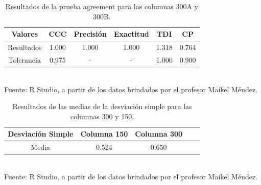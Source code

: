 \documentclass[12pt, letterpaper]{article}
\begin{document}
\begin{table}[ht]
\centering
\caption{Resultados de la prueba agreement para las columnas 300A y 300B.}
\begin{tabular}{cccccc}
  \hline
Valores & CCC & Precisión & Exactitud & TDI & CP \\ 
  \hline
  Resultados & 1.000 & 1.000 & 1.000 & 1.318 & 0.764 \\ 
  Tolerancia & 0.975 & - & - & 1.000 & 0.900 \\ 
   \hline
\end{tabular}\\
Fuente: R Studio, a partir de los datos brindados por el profesor Maikel Méndez.
\end{table}

\begin{table}[ht]
\centering
\caption{Resultados de las medias de la desviación simple para las columnas 300 y 150.}
\begin{tabular}{ccccc}
  \hline
Desviación Simple & Columna 150 & Columna 300 \\ 
  \hline
  Media & 0.524 & 0.650
  \\ 
  \hline
\end{tabular}\\
Fuente: R Studio, a partir de los datos brindados por el profesor Maikel Méndez.
\end{table}
\end{document}
